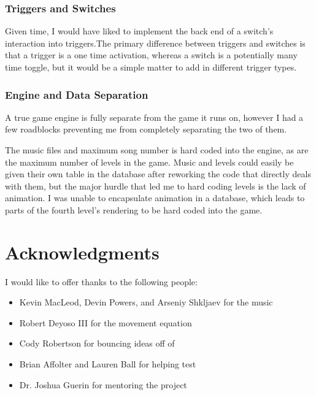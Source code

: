 \documentclass{article}
\begin{document}
\subsubsection{Triggers and Switches} \label{subsubsec:trigandswitch}

Given time, I would have liked to implement the back end of a switch's interaction into triggers.The primary difference between triggers and switches is that a trigger is a one time activation, whereas a switch is a potentially many time toggle, but it would be a simple matter to add in different trigger types.

\subsubsection{Engine and Data Separation} \label{subsubsec:seperation}

A true game engine is fully separate from the game it runs on, however I had a few roadblocks preventing me from completely separating the two of them.

The music files and maximum song number is hard coded into the engine, as are the maximum number of levels in the game. Music and levels could easily be given their own table in the database after reworking the code that directly deals with them, but the major hurdle that led me to hard coding levels is the lack of animation. I was unable to encapsulate animation in a database, which leads to parts of the fourth level's rendering to be hard coded into the game.

\section{Acknowledgments} \label{sec:acknowledge}

I would like to offer thanks to the following people:

\begin{itemize}
	\item Kevin MacLeod, Devin Powers, and Arseniy Shkljaev for the music
	\item Robert Deyoso III for the movement equation
	\item Cody Robertson for bouncing ideas off of
	\item Brian Affolter and Lauren Ball for helping test
	\item Dr. Joshua Guerin for mentoring the project
\end{itemize}

\pagebreak
\end{document}
